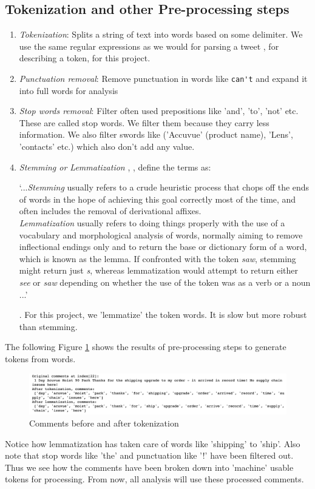 \documentclass[11pt, letterpaper]{article}
\newcommand{\xquote}[1]{\begin{displayquote}\enquote*{#1}\end{displayquote}}
\begin{document}
\subsection{Tokenization and other Pre-processing steps}\label{tokenization}
\begin{enumerate}
 \item \textit{Tokenization}: Splits a string of text into words based on some delimiter. We use the same regular expressions as we would for parsing a tweet \autocite{tokenization}, for describing a token, for this project. 

\item \textit{Punctuation removal}: Remove punctuation in words like \verb|can't| and expand it into full words for analysis

\item \textit{Stop words removal}: Filter often used prepositions like 'and', 'to', 'not' etc. These are called stop words. We filter them because they carry less information. We also filter swords like ('Accuvue' (product name), 'Lens', 'contacts' etc.) which also don't add any value.

\item \textit{Stemming or Lemmatization} \autocite{lemmatization}, \autocite{porter80}, define the terms as: 
\xquote{...\textit{Stemming} usually refers to a crude heuristic process that chops off the ends of words in the hope of achieving this goal correctly most of the time, and often includes the removal of derivational affixes.\\
\textit{Lemmatization} usually refers to doing things properly with the use of a vocabulary and morphological analysis of words, normally aiming to remove inflectional endings only and to return the base or dictionary form of a word, which is known as the lemma.
If confronted with the token \textit{saw}, stemming might return just \textit{s}, whereas lemmatization would attempt to return either \textit{see} or \textit{saw} depending on whether the use of the token was as a verb or a noun ...}. For this project, we 'lemmatize' the token words. It is slow but more robust than stemming.
\end{enumerate}
The following Figure \ref{fig:tokenization} shows the results of pre-processing steps to generate tokens from words.
\begin{figure}[H]%
    \centering
    \includegraphics[width=\linewidth]{tokenization.png}%
    \caption{Comments before and after tokenization}%
    \label{fig:tokenization}
\end{figure}
Notice how lemmatization has taken care of words like 'shipping' to 'ship'. Also note that stop words like 'the' and punctuation like '!' have been filtered out. Thus we see how the comments have been broken down into 'machine' usable tokens for processing. From now, all analysis will use these processed comments.
\end{document}
